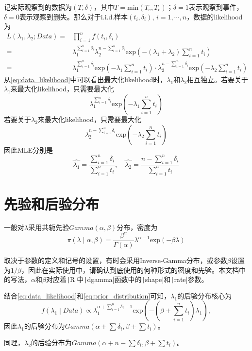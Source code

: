 \documentclass[a4paper,12pt]{article}
\begin{document}
记实际观察到的数据为$\left(T, \delta\right)$，其中$T = \mathrm{min}\left(T_e, T_c\right)$；$\delta = 1$表示观察到事件，$\delta = 0$表示观察到删失。那么对于i.i.d.样本$\left(t_i, \delta_i\right)$, $i = 1, \cdots, n$，数据的likelihood为
\begin{equation}
  \label{eq:data_likelihood}
  \begin{aligned}
    L\left(\lambda_1, \lambda_2; Data\right)
    =& \prod\limits_{i = 1}^nf\left(t_i, \delta_i\right)    \\
    =& \lambda_1^{\sum\limits_{i = 1}^n\delta_i}
    \lambda_2^{n - \sum\limits_{i = 1}^n\delta_i}
    \mathrm{exp}\left(-\left(\lambda_1 + \lambda_2\right)\sum\limits_{i = 1}^n t_i\right)    \\
    =& \lambda_1^{\sum\limits_{i = 1}^n\delta_i}
    \mathrm{exp}\left(-\lambda_1\sum\limits_{i = 1}^n t_i\right)
    \cdot
    \lambda_2^{n - \sum\limits_{i = 1}^n\delta_i}
    \mathrm{exp}\left(-\lambda_2\sum\limits_{i = 1}^n t_i\right)
  \end{aligned}
\end{equation}
从\eqref{eq:data_likelihood}中可以看出最大化likelihood时，$\lambda_1$和$\lambda_2$相互独立。若要关于$\lambda_1$来最大化likelihood，只需要最大化
\[
  \lambda_1^{\sum\limits_{i = 1}^n\delta_i}
  \mathrm{exp}\left(-\lambda_1\sum\limits_{i = 1}^n t_i\right)
\]
若要关于$\lambda_2$来最大化likelihood，只需要最大化
\[
  \lambda_2^{n - \sum\limits_{i = 1}^n\delta_i}
  \mathrm{exp}\left(-\lambda_2\sum\limits_{i = 1}^n t_i\right)
\]
因此MLE分别是
\[
  \hat{\lambda_1} = \frac{\sum\limits_{i = 1}^n\delta_i}{\sum\limits_{i = 1}^n t_i}
  ,\quad
  \hat{\lambda_2} = \frac{n - \sum\limits_{i = 1}^n\delta_i}{\sum\limits_{i = 1}^n t_i}
\]

\section{先验和后验分布}
\label{sec:prior_and_posterior_distribution}

一般对$\lambda$采用共轭先验$Gamma\left(\alpha, \beta\right)$分布，密度为
\begin{equation}
  \label{eq:prior_distribution}
  \pi\left(\lambda\middle|\alpha, \beta\right)
  = \frac{\beta^\alpha}{\Gamma\left(\alpha\right)}
  \lambda^{\alpha - 1}\mathrm{exp}\left(-\beta\lambda\right)
\end{equation}

取决于参数的定义和记号的设置，有时会采用Inverse-Gamma分布，或参数$\beta$设置为$1 / \beta$，因此在实际使用中，请确认到底使用的何种形式的密度和先验。本文档中的写法，$\alpha$和$\beta$对应着\texttt|R|中\texttt|dgamma|函数中的\texttt|shape|和\texttt|rate|参数。
\par
结合\eqref{eq:data_likelihood}和\eqref{eq:prior_distribution}可知，$\lambda_1$的后验分布核心为
\[
  f\left(\lambda_1\middle|Data\right)
  \propto
  \lambda_1^{\alpha + \sum\limits_{i = 1}^n\delta_i - 1}
  \mathrm{exp}\left(-\left(\beta + \sum\limits_{i = 1}^n t_i\right)\lambda_1\right)
  ,
\]
因此$\lambda_1$的后验分布为$Gamma\left(\alpha + \sum\delta_i, \beta + \sum t_i\right)$。
\par
同理，$\lambda_2$的后验分布为$Gamma\left(\alpha + n - \sum \delta_i, \beta + \sum t_i\right)$。
\end{document}
